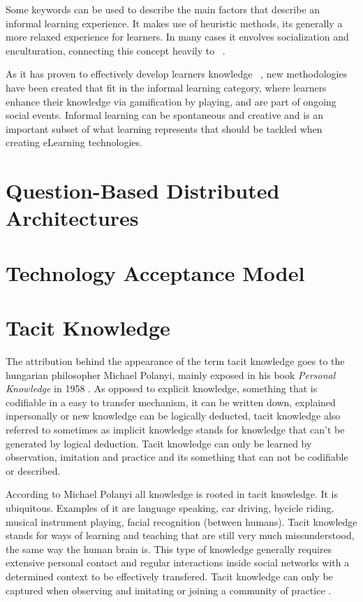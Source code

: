 Some keywords can be used to describe the main factors that describe an informal 
learning experience. It makes use of heuristic methods, its generally a more relaxed
experience for learners. In many cases it envolves socialization and enculturation, 
connecting this concept heavily to ~. 

As it has proven to effectively develop learners knowledge 
~\cite{bridginginschoolandoutofschoollearning}, new methodologies have been created
that fit in the informal learning category, where learners enhance their knowledge
via gamification by playing, and are part of ongoing social events. Informal learning
can be spontaneous and creative and is an important subset of what learning represents
that should be tackled when creating eLearning technologies.



\section{Question-Based Distributed Architectures}



\section{Technology Acceptance Model}



\section{Tacit Knowledge}
\label{section:tacit_knowledge}

The attribution behind the appearance of the term tacit knowledge goes to the 
hungarian philosopher Michael Polanyi, mainly exposed in his book 
\textit{Personal Knowledge} in 1958 \cite{tacitknowledgerevisited}.
As opposed to explicit knowledge, something that is codifiable in a easy to transfer
mechanism, it can be written down, explained inpersonally or new knowledge can be 
logically deducted, tacit knowledge also referred to
sometimes as implicit knowledge stands for knowledge that can't be generated by 
logical deduction. Tacit knowledge can only be learned by observation, imitation and
practice and its something that can not be codifiable or described. \cite{polanyi_1958}

According to Michael Polanyi all knowledge is rooted in tacit knowledge. It is 
ubiquitous. Examples of it are language speaking, car driving, bycicle riding, 
musical instrument playing, facial recognition (between humans). Tacit knowledge 
stands for ways of learning and teaching that are still very much missunderstood, the
same way the human brain is. This type of knowledge generally requires extensive 
personal contact and regular interactions inside social networks with a determined
context to be effectively transfered. Tacit knowledge can only be captured when 
observing and imitating or joining a community of practice \cite{goffin_koners_2011}.

